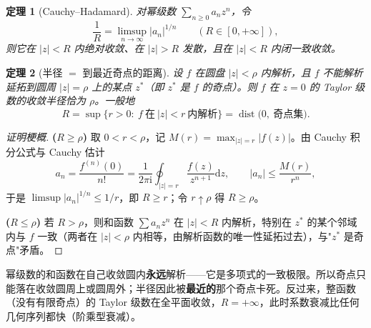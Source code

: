 \documentclass[11pt,a4paper]{ctexart}
\newtheorem{theorem}{定理}[section]
\theoremstyle{definition}
\newcommand{\dd}{\mathrm{d}}
\newcommand{\ii}{\mathrm{i}}
\begin{document}
\begin{theorem}[Cauchy--Hadamard]
对幂级数 $\sum_{n\ge0}a_nz^n$，令
\[
\frac1R=\limsup_{n\to\infty}|a_n|^{1/n}\qquad (R\in[0,+\infty]),
\]
则它在 $|z|<R$ 内绝对收敛、在 $|z|>R$ 发散，且在 $|z|<R$ 内闭一致收敛。
\end{theorem}

\begin{theorem}[半径 $=$ 到最近奇点的距离]\label{thm:dist}
设 $f$ 在圆盘 $|z|<\rho$ 内解析，且 $f$ 不能解析延拓到圆周 $|z|=\rho$ 上的某点 $z^\ast$（即 $z^\ast$ 是 $f$ 的奇点）。则 $f$ 在 $z=0$ 的 Taylor 级数的收敛半径恰为 $\rho$。一般地
\[
R=\sup\{r>0:\ f\ \text{在}\ |z|<r\ \text{内解析}\}=\operatorname{dist}\bigl(0,\ \text{奇点集}\bigr).
\]
\end{theorem}

\begin{proof}[证明梗概]
\textbf{($R\ge\rho$)} 取 $0<r<\rho$，记 $M(r)=\max_{|z|=r}|f(z)|$。由 Cauchy 积分公式与 Cauchy 估计
\[
a_n=\frac{f^{(n)}(0)}{n!}=\frac{1}{2\pi\ii}\oint_{|z|=r}\frac{f(z)}{z^{n+1}}\dd z,
\qquad |a_n|\le\frac{M(r)}{r^n},
\]
于是 $\limsup|a_n|^{1/n}\le 1/r$，即 $R\ge r$；令 $r\uparrow\rho$ 得 $R\ge\rho$。

\textbf{($R\le\rho$)} 若 $R>\rho$，则和函数 $\sum a_nz^n$ 在 $|z|<R$ 内解析，特别在 $z^\ast$ 的某个邻域内与 $f$ 一致（两者在 $|z|<\rho$ 内相等，由解析函数的唯一性延拓过去），与"$z^\ast$ 是奇点"矛盾。
\end{proof}

\begin{ideabox}[机制：收敛圆内不可能有奇点]
幂级数的和函数在自己收敛圆内\textbf{永远}解析——它是多项式的一致极限。所以奇点只能落在收敛圆周上或圆周外；半径因此被\textbf{最近的}那个奇点卡死。反过来，整函数（没有有限奇点）的 Taylor 级数在全平面收敛，$R=+\infty$，此时系数衰减比任何几何序列都快（阶乘型衰减）。
\end{ideabox}
\end{document}
